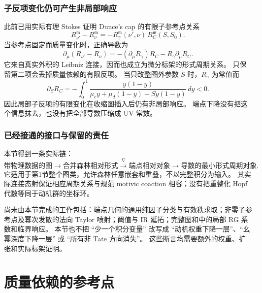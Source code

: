 \documentclass[11pt,a4paper,oneside]{ctexart}
\theoremstyle{cnplain}
\theoremstyle{definition}
\theoremstyle{remark}
\newcommand{\Q}{\mathbb Q}
\numberwithin{equation}{section}
\begin{document}
\subsubsection{子反项变化仍可产生非局部响应}
此前已用实际有理 Stokes 证明 Dunce's cap 的有限子参考点关系
\begin{equation}\label{descent:eq:scheme}
 R_{\nu'}^{\mathfrak m}-R_\nu^{\mathfrak m}
   =-R_\gamma^{\mathfrak m}(\nu',\nu)\,
                         R_C^{\mathfrak m}(S,S_0).
\end{equation}
当参考点固定而质量变化时，正确导数为
\begin{equation}\label{descent:eq:schemederivative}
 \partial_\mu(R_{\nu'}-R_\nu)
 =-(\partial_\mu R_\gamma)R_C
                        -R_\gamma\partial_\mu R_C.
\end{equation}
它来自真实外积的 Leibniz 连接，因而也成立为微分标架的形式周期关系。
只保留第二项会丢掉质量依赖的有限反项。
当只改整图外参数 $S$ 时，$R_\gamma$ 为常值而
\[
 \partial_SR_C=-\int_0^1
       \frac{y(1-y)}{\mu_cy+\mu_d(1-y)+S y(1-y)}\,dy<0.
\]
因此局部子反项的有限变化在收缩图插入后仍有非局部响应。
端点下降没有把这个信息抹去，也没有把全部导数压缩成 UV 常数。

\subsubsection{已经接通的接口与保留的责任}
本节得到一条实际链：
\[
 \text{带物理数据的图}
 \longrightarrow\text{合并森林相对形式}
 \xrightarrow{\nabla}\text{端点相对对象}
 \longrightarrow\text{导数的最小形式周期对象}.
\]
它适用于第1节整个图类，允许森林任意嵌套和重叠，不以完整积分为输入。
其实际连接态射保证相应周期关系与规范 motivic coaction 相容；没有把重整化 Hopf 代数等同于动机群的坐标环。

尚未由本节完成的工作包括：端点几何的通用纯因子分类与有效秩求取；非零子参考点及幂次发散的法向 Taylor 喷射；阈值与 IR 延拓；完整图和中的局部 RG 系数和临界响应。
本节也不把 ``少一个积分变量'' 改写成 ``动机权重下降一层''、``幺幂深度下降一层'' 或 ``所有非 Tate 方向消失''。
这些断言均需要额外的权重、扩张和实际标架证明。


\endgroup

\section{质量依赖的参考点}\label{supp:finitemom}

\begingroup
\providecommand{\Q}{\mathbb Q}
\providecommand{\cP}{\mathcal P}
\providecommand{\cC}{\mathcal C}
\providecommand{\ev}{\operatorname{ev}}
\providecommand{\per}{\operatorname{per}}
\providecommand{\eps}{\varepsilon_H}
\end{document}
